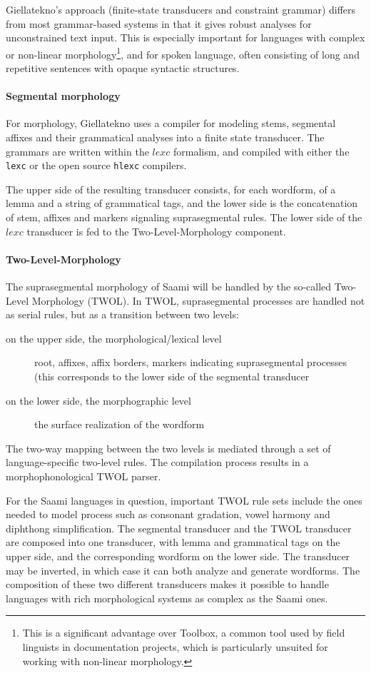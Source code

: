 \documentclass[a4paper,12pt]{article}
\begin{document}
Giellatekno's approach (finite-state transducers and constraint grammar) differs from most grammar-based systems in that it gives robust analyses for unconstrained text input. This is especially important for languages with complex or non-linear morphology\footnote{This is a significant advantage over Toolbox, a common tool used by field linguists in documentation projects, which is particularly unsuited for working with non-linear morphology.}, and for spoken language, often consisting of long and repetitive sentences with opaque syntactic structures.

\paragraph{Segmental morphology}
For morphology, Giellatekno uses a compiler for modeling stems, segmental affixes and their grammatical analyses into a finite state transducer. The grammars are written within the $lexc$ formalism, and compiled with either the \texttt{lexc} or the open source \texttt{hlexc} compilers. 

The upper side of the resulting transducer consists, for each wordform, of a lemma and a string of grammatical tags, and the lower side is the concatenation of stem, affixes and markers signaling suprasegmental rules. The lower side of the $lexc$ transducer is fed to the Two-Level-Morphology component.

\paragraph{Two-Level-Morphology}
The suprasegmental morphology of Saami will be handled by the so-called Two-Level Morphology (TWOL). In TWOL, suprasegmental processes are handled not as serial rules, but as a transition between two levels:
\begin{description}
\item[on the upper side, the morphological/lexical level] root, affixes, affix borders, markers indicating suprasegmental processes (this corresponds to the lower side of the segmental transducer
\item[on the lower side, the morphographic level] the surface realization of the wordform
\end{description}
The two-way mapping between the two levels is mediated through a set of language-specific two-level rules. The compilation process results in a morphophonological TWOL parser.

For the Saami languages in question, important TWOL rule sets include the ones needed to model process such as consonant gradation, vowel harmony and diphthong simplification. The segmental transducer and the TWOL transducer are composed into one transducer, with lemma and grammatical tags on the upper side, and the corresponding wordform on the lower side. The transducer may be inverted, in which case it can both analyze and generate wordforms. The composition of these two different transducers makes it possible to handle languages with rich morphological systems as complex as the Saami ones. 
\end{document}
